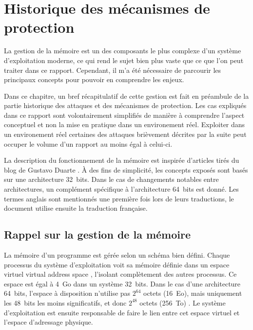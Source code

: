 \chapter{Historique des mécanismes de protection}
\label{chap:historique}

La gestion de la mémoire est un des composants le plus complexe d'un système d'exploitation moderne, ce qui rend le sujet bien plus vaste que ce que l'on peut traiter dans ce rapport. Cependant, il m'a été nécessaire de parcourir les principaux concepts pour pouvoir en comprendre les enjeux.

Dans ce chapitre, un bref récapitulatif de cette gestion est fait en préambule de la partie historique des attaques et des mécanismes de protection. Les cas expliqués dans ce rapport sont volontairement simplifiés de manière à comprendre l'aspect conceptuel et non la mise en pratique dans un environement réel. Exploiter dans un environement réel certaines des attaques brièvement décrites par la suite peut occuper le volume d'un rapport au moins égal à celui-ci.

La description du fonctionnement de la mémoire est inspirée d'articles tirés du blog de Gustavo Duarte \cite{AnatomyOfAProgramInMemory, HowTheKernelManagesYourMemory, JourneyToTheStackPartI}. À des fins de simplicité, les concepts exposés sont basés sur une architecture 32~bits. Dans le cas de changements notables entre architectures, un complément spécifique à l'architecture 64~bits est donné. Les termes anglais sont mentionnés une première fois lors de leurs traductions, le document utilise ensuite la traduction française.

\minitoc

\newpage

\section{Rappel sur la gestion de la mémoire}

La mémoire d'un programme est gérée selon un schéma bien défini. Chaque processus du système d'exploitation voit sa mémoire définie dans un espace virtuel \og virtual address space \fg, l'isolant complètement des autres processus. Ce espace est égal à 4~Go dans un système 32~bits. Dans le cas d'une architecture 64~bits, l'espace à disposition n'utilise pas $2^{64}$ octets (16~Eo), mais uniquement les 48~bits les moins significatifs, et donc $2^{48}$ octets (256~To) \cite{64bitComputing,VirtualAddressSpaceDetails}. Le système d'exploitation est ensuite responsable de faire le lien entre cet espace virtuel et l'espace d'adressage physique.

